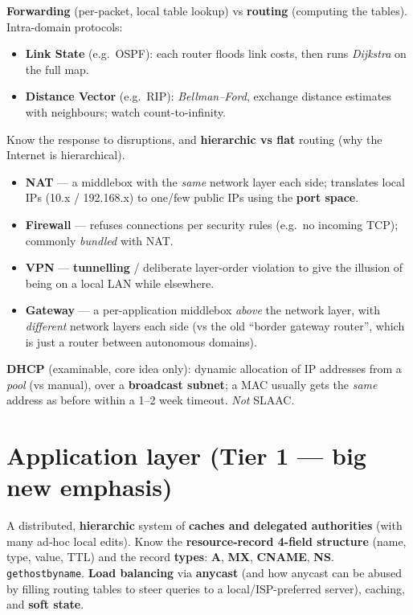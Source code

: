 \documentclass[11pt,a4paper]{article}
\begin{document}
\begin{must}[title=Routing]
\textbf{Forwarding} (per-packet, local table lookup) vs \textbf{routing} (computing the tables). Intra-domain protocols:
\begin{itemize}[leftmargin=*,itemsep=0pt]
  \item \textbf{Link State} (e.g.\ OSPF): each router floods link costs, then runs \emph{Dijkstra} on the full map.
  \item \textbf{Distance Vector} (e.g.\ RIP): \emph{Bellman--Ford}, exchange distance estimates with neighbours; watch count-to-infinity.
\end{itemize}
Know the response to disruptions, and \textbf{hierarchic vs flat} routing (why the Internet is hierarchical).
\end{must}

\begin{useful}[title=Middleboxes --- the ``four-sentence'' depth the lecturer asked for]
\begin{itemize}[leftmargin=*,itemsep=0pt]
  \item \textbf{NAT} --- a middlebox with the \emph{same} network layer each side; translates local IPs (10.x / 192.168.x) to one/few public IPs using the \textbf{port space}.
  \item \textbf{Firewall} --- refuses connections per security rules (e.g.\ no incoming TCP); commonly \emph{bundled} with NAT.
  \item \textbf{VPN} --- \textbf{tunnelling} / deliberate layer-order violation to give the illusion of being on a local LAN while elsewhere.
  \item \textbf{Gateway} --- a per-application middlebox \emph{above} the network layer, with \emph{different} network layers each side (vs the old ``border gateway router'', which is just a router between autonomous domains).
\end{itemize}
\textbf{DHCP} (examinable, core idea only): dynamic allocation of IP addresses from a \emph{pool} (vs manual), over a \textbf{broadcast subnet}; a MAC usually gets the \emph{same} address as before within a 1--2 week timeout. \emph{Not} SLAAC.
\end{useful}

\section{Application layer (Tier 1 --- big new emphasis)}

\begin{must}[title=DNS]
A distributed, \textbf{hierarchic} system of \textbf{caches and delegated authorities} (with many ad-hoc local edits). Know the \textbf{resource-record 4-field structure} (name, type, value, TTL) and the record \textbf{types}: \textbf{A}, \textbf{MX}, \textbf{CNAME}, \textbf{NS}. \texttt{gethostbyname}. \textbf{Load balancing} via \textbf{anycast} (and how anycast can be abused by filling routing tables to steer queries to a local/ISP-preferred server), caching, and \textbf{soft state}.
\end{must}
\end{document}
